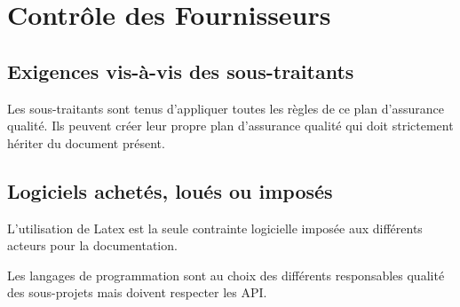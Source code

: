 \section{Contrôle des Fournisseurs}

\subsection{Exigences vis-à-vis des sous-traitants}
Les sous-traitants sont tenus d'appliquer toutes les règles de ce plan 
d'assurance qualité.
Ils peuvent créer leur propre plan d'assurance qualité qui doit strictement 
hériter du document présent.

\subsection{Logiciels achetés, loués ou imposés}
L'utilisation de Latex est la seule contrainte logicielle imposée aux 
différents acteurs pour la documentation.

Les langages de programmation sont au choix des différents responsables qualité
des sous-projets mais doivent respecter les API.

\vfill
\pagebreak
